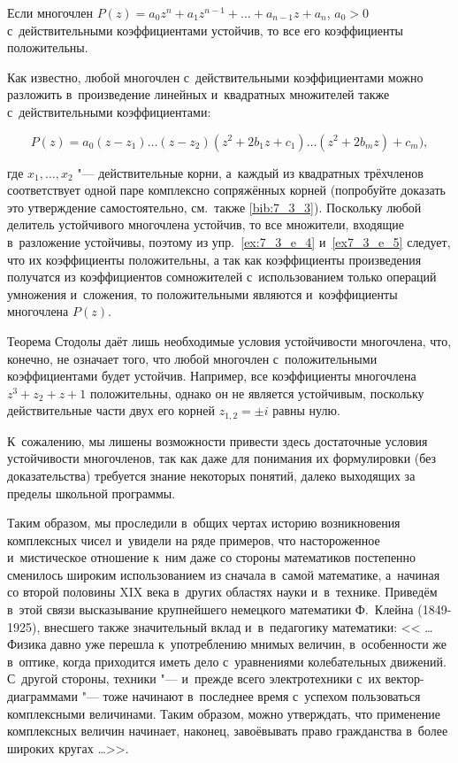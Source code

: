 \begin{Th}\label{th:7_3_1}
Если многочлен $P(z) = a_{0}z^{n} + a_{1}z^{n-1} + \dots + a_{n-1}z + a_{n}$,
$a_{0} > 0$ с~действительными коэффициентами устойчив,
то все его коэффициенты положительны.
\end{Th}

Как известно, любой многочлен с~действительными коэффициентами можно разложить
в~произведение линейных и~квадратных множителей также с~действительными
коэффициентами:

\begin{equation*}
P(z) = a_{0}(z - z_{1}) \dots
(z - z_{2})(z^{2} + 2b_{1}z + c_{1}) \dots
(z^{2} + 2b_{m}z) + c_{m}),
\end{equation*}

\noindent
где $x_{1}, \dots, x_{2}$ "--- действительные корни, а~каждый из квадратных
трёхчленов соответствует одной паре комплексно сопряжённых корней (попробуйте
доказать это утверждение самостоятельно, см.\ также \ref{bib:7_3_3}). Поскольку любой
делитель устойчивого многочлена устойчив, то все множители, входящие
в~разложение устойчивы, поэтому из  упр.\ \ref{ex:7_3_e_4} и~\ref{ex7_3_e_5}
следует, что их коэффициенты положительны, а так как коэффициенты произведения
получатся из коэффициентов сомножителей с~использованием только операций
умножения и~сложения, то положительными являются и~коэффициенты многочлена $P(z)$.

Теорема Стодолы даёт лишь необходимые условия устойчивости многочлена, что,
конечно, не означает того, что любой многочлен с~положительными коэффициентами
будет устойчив. Например, все коэффициенты многочлена $z^{3} + z_{2} + z + 1$
положительны, однако он не является устойчивым, поскольку действительные части
двух его корней $z_{1, 2} = \pm i$  равны нулю.

К~сожалению, мы лишены возможности привести здесь достаточные условия
устойчивости многочленов, так как даже для понимания их формулировки (без
доказательства) требуется знание некоторых понятий, далеко выходящих за
пределы школьной программы.

Таким образом, мы проследили в~общих чертах историю возникновения комплексных
чисел и~увидели на ряде примеров, что настороженное и~мистическое отношение
к~ним даже со стороны математиков постепенно сменилось широким использованием
из сначала в~самой математике, а~начиная со второй половины XIX века в~других
областях науки и~в~технике. Приведём в~этой связи высказывание крупнейшего
немецкого математики Ф.~Клейна (1849-1925), внесшего также значительный вклад
и~в~педагогику математики: << \dots Физика давно уже перешла к~употреблению
мнимых величин, в~особенности же в~оптике, когда приходится иметь дело
с~уравнениями колебательных движений. С~другой стороны, техники "--- и~прежде
всего электротехники с~их вектор-диаграммами "--- тоже начинают в~последнее
время с~успехом пользоваться комплексными величинами. Таким образом, можно
утверждать, что применение комплексных величин начинает, наконец, завоёвывать
право гражданства в~более широких кругах \dots >>.

